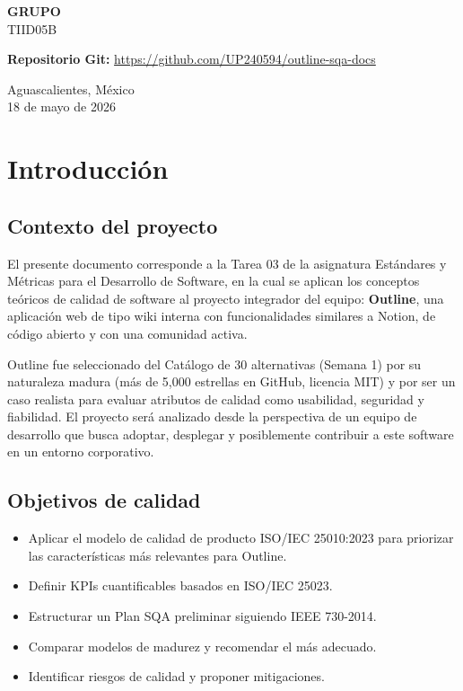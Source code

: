 \documentclass[12pt]{article}
\begin{document}
\begin{titlepage}
\begin{center}
        \vspace{0.4cm}

        {\large \textbf{GRUPO}}\\
        TIID05B

        \vfill
        {\large \textbf{Repositorio Git:} \url{https://github.com/UP240594/outline-sqa-docs}}

        {\large Aguascalientes, México\\
        18 de mayo de 2026}
    \end{center}
\end{titlepage}

\newpage
\tableofcontents
\newpage

\section{Introducción}

\subsection{Contexto del proyecto}
El presente documento corresponde a la Tarea 03 de la asignatura Estándares y Métricas para el Desarrollo de Software, en la cual se aplican los conceptos teóricos de calidad de software al proyecto integrador del equipo: \textbf{Outline}, una aplicación web de tipo wiki interna con funcionalidades similares a Notion, de código abierto y con una comunidad activa.

Outline fue seleccionado del Catálogo de 30 alternativas (Semana 1) por su naturaleza madura (más de 5,000 estrellas en GitHub, licencia MIT) y por ser un caso realista para evaluar atributos de calidad como usabilidad, seguridad y fiabilidad. El proyecto será analizado desde la perspectiva de un equipo de desarrollo que busca adoptar, desplegar y posiblemente contribuir a este software en un entorno corporativo.

\subsection{Objetivos de calidad}
\begin{itemize}
    \item Aplicar el modelo de calidad de producto ISO/IEC 25010:2023 para priorizar las características más relevantes para Outline.
    \item Definir KPIs cuantificables basados en ISO/IEC 25023.
    \item Estructurar un Plan SQA preliminar siguiendo IEEE 730-2014.
    \item Comparar modelos de madurez y recomendar el más adecuado.
    \item Identificar riesgos de calidad y proponer mitigaciones.
\end{itemize}
\end{document}
